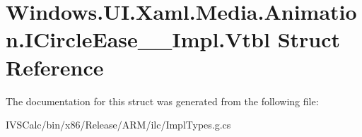 \hypertarget{struct_windows_1_1_u_i_1_1_xaml_1_1_media_1_1_animation_1_1_i_circle_ease_____impl_1_1_vtbl}{}\section{Windows.\+U\+I.\+Xaml.\+Media.\+Animation.\+I\+Circle\+Ease\+\_\+\+\_\+\+Impl.\+Vtbl Struct Reference}
\label{struct_windows_1_1_u_i_1_1_xaml_1_1_media_1_1_animation_1_1_i_circle_ease_____impl_1_1_vtbl}


The documentation for this struct was generated from the following file\+:\begin{DoxyCompactItemize}
\item 
I\+V\+S\+Calc/bin/x86/\+Release/\+A\+R\+M/ilc/Impl\+Types.\+g.\+cs\end{DoxyCompactItemize}
